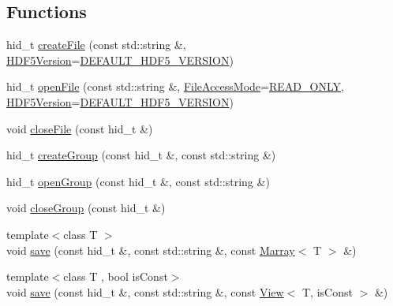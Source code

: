 \subsection*{Functions}
\begin{DoxyCompactItemize}
\item 
hid\+\_\+t \hyperlink{namespaceandres_1_1hdf5_a1f779b6e42349512d5227fbb6dcf92cd}{create\+File} (const std\+::string \&, \hyperlink{namespaceandres_1_1hdf5_ad5194a7b8773d3776e8dfc068f58f41b}{H\+D\+F5\+Version}=\hyperlink{namespaceandres_1_1hdf5_ad5194a7b8773d3776e8dfc068f58f41baf4fdc18c306e5d07105ad62a1cf6fa93}{D\+E\+F\+A\+U\+L\+T\+\_\+\+H\+D\+F5\+\_\+\+V\+E\+R\+S\+I\+ON})
\item 
hid\+\_\+t \hyperlink{namespaceandres_1_1hdf5_a3645de3466468274059f8475066ff820}{open\+File} (const std\+::string \&, \hyperlink{namespaceandres_1_1hdf5_a08660935c7de0e1e76e007fc972933b9}{File\+Access\+Mode}=\hyperlink{namespaceandres_1_1hdf5_a08660935c7de0e1e76e007fc972933b9af05cb745b770e55c64efe88162f7e9fb}{R\+E\+A\+D\+\_\+\+O\+N\+LY}, \hyperlink{namespaceandres_1_1hdf5_ad5194a7b8773d3776e8dfc068f58f41b}{H\+D\+F5\+Version}=\hyperlink{namespaceandres_1_1hdf5_ad5194a7b8773d3776e8dfc068f58f41baf4fdc18c306e5d07105ad62a1cf6fa93}{D\+E\+F\+A\+U\+L\+T\+\_\+\+H\+D\+F5\+\_\+\+V\+E\+R\+S\+I\+ON})
\item 
void \hyperlink{namespaceandres_1_1hdf5_afa6545825e5557eecf6ac1e8fc68bb56}{close\+File} (const hid\+\_\+t \&)
\item 
hid\+\_\+t \hyperlink{namespaceandres_1_1hdf5_ac03dd5212231c5335a0a02edb3c0d879}{create\+Group} (const hid\+\_\+t \&, const std\+::string \&)
\item 
hid\+\_\+t \hyperlink{namespaceandres_1_1hdf5_a3d7159f65f86576c9142409b08afcfc9}{open\+Group} (const hid\+\_\+t \&, const std\+::string \&)
\item 
void \hyperlink{namespaceandres_1_1hdf5_a1aaf506863ec820cdcc827c7997d4ba3}{close\+Group} (const hid\+\_\+t \&)
\item 
{\footnotesize template$<$class T $>$ }\\void \hyperlink{namespaceandres_1_1hdf5_a0bc471ab828dcfdedd90dc6f991b509e}{save} (const hid\+\_\+t \&, const std\+::string \&, const \hyperlink{classandres_1_1Marray}{Marray}$<$ T $>$ \&)
\item 
{\footnotesize template$<$class T , bool is\+Const$>$ }\\void \hyperlink{namespaceandres_1_1hdf5_ac6995803b0ec6079698d61563b5de104}{save} (const hid\+\_\+t \&, const std\+::string \&, const \hyperlink{classandres_1_1View}{View}$<$ T, is\+Const $>$ \&)

\end{DoxyCompactItemize}
